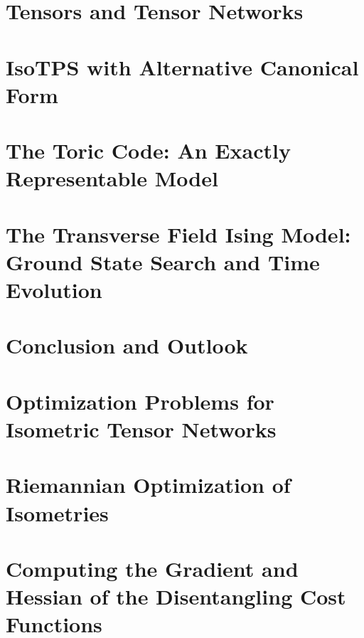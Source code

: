 \documentclass[encoding=utf8,british]{template/thesis}
\begin{document}
	\chapter{Tensors and Tensor Networks}
	\label{chap:tensors_and_tensor_networks}
	
	
	\chapter{IsoTPS with Alternative Canonical Form}
	\label{chap:isoTPS_alternative_canonical_form}
	
	
	\chapter{The Toric Code: An Exactly Representable Model}
	\label{chap:toric_code}
	
	
	\chapter{The Transverse Field Ising Model: Ground State Search and Time Evolution}
	\label{chap:TFI}
	
	
	\chapter{Conclusion and Outlook}
	\label{chap:summary}
	
	
	\appendix
	
	\chapter{Optimization Problems for Isometric Tensor Networks}
	\label{app:optimization_problems_for_isometric_tensor_networks}
	
	
	\chapter{Riemannian Optimization of Isometries}
	\label{app:riemannian_optimization_of_isometries}
	
	
	\chapter{Computing the Gradient and Hessian of the Disentangling Cost Functions}
	\label{app:computation_of_gradient_and_hvp_for_riemannian_optimization}
		
	
	\backmatter
	\printbibliography
	
\end{document}
